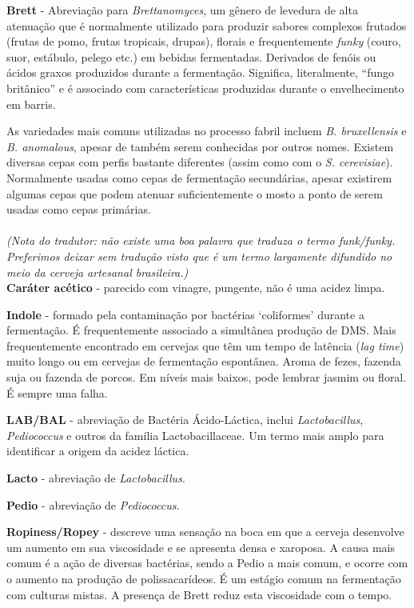 \textbf{Brett} - Abreviação para \textit{Brettanomyces}, um gênero de levedura de alta atenuação que é normalmente utilizado para produzir sabores complexos frutados (frutas de pomo, frutas tropicais, drupas), florais e frequentemente \textit{funky} (couro, suor, estábulo, pelego etc.) em bebidas fermentadas. Derivados de fenóis ou ácidos graxos produzidos durante a fermentação. Significa, literalmente, “fungo britânico” e é associado com características produzidas durante o envelhecimento em barris.

As variedades mais comuns utilizadas no processo fabril incluem \textit{B. bruxellensis} e \textit{B. anomalous}, apesar de também serem conhecidas por outros nomes. Existem diversas cepas com perfis bastante diferentes (assim como com o \textit{S. cerevisiae}). Normalmente usadas como cepas de fermentação secundárias, apesar existirem algumas cepas que podem atenuar suficientemente o mosto a ponto de serem usadas como cepas primárias.\\\\
\textit{(Nota do tradutor: não existe uma boa palavra que traduza o termo funk/funky. Preferimos deixar sem tradução visto que é um termo largamente difundido no meio da cerveja artesanal brasileira.)}\\

\textbf{Caráter acético} - parecido com vinagre, pungente, não é uma acidez limpa.

\textbf{Indole} - formado pela contaminação por bactérias ‘coliformes’ durante a fermentação. É frequentemente associado a simultânea produção de DMS. Mais frequentemente encontrado em cervejas que têm um tempo de latência (\textit{lag time}) muito longo ou em cervejas de fermentação espontânea. Aroma de fezes, fazenda suja ou fazenda de porcos. Em níveis mais baixos, pode lembrar jasmim ou floral. É sempre uma falha.

\textbf{LAB/BAL} - abreviação de Bactéria Ácido-Láctica, inclui \textit{Lactobacillus}, \textit{Pediococcus} e outros da família Lactobacillaceae. Um termo mais amplo para identificar a origem da acidez láctica.

\textbf{Lacto} - abreviação de \textit{Lactobacillus}.

\textbf{Pedio} - abreviação de \textit{Pediococcus}.

\textbf{Ropiness/Ropey} - descreve uma sensação na boca em que a cerveja desenvolve um aumento em sua viscosidade e se apresenta densa e xaroposa. A causa mais comum é a ação de diversas bactérias, sendo a Pedio a mais comum, e ocorre com o aumento na produção de polissacarídeos. É um estágio comum na fermentação com culturas mistas. A presença de Brett reduz esta viscosidade com o tempo.

